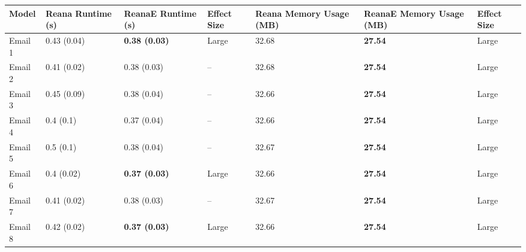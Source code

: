 \begin{tabular}{lllllll}
\toprule
   Model & Reana Runtime (s) &    ReanaE Runtime (s) & Effect Size & Reana Memory Usage (MB) & ReanaE Memory Usage (MB) & Effect Size \\
\midrule
 Email 1 &       0.43 (0.04) &  \textbf{0.38 (0.03)} &       Large &                   32.68 &           \textbf{27.54} &       Large \\
 Email 2 &       0.41 (0.02) &           0.38 (0.03) &          -- &                   32.68 &           \textbf{27.54} &       Large \\
 Email 3 &       0.45 (0.09) &           0.38 (0.04) &          -- &                   32.66 &           \textbf{27.54} &       Large \\
 Email 4 &         0.4 (0.1) &           0.37 (0.04) &          -- &                   32.66 &           \textbf{27.54} &       Large \\
 Email 5 &         0.5 (0.1) &           0.38 (0.04) &          -- &                   32.67 &           \textbf{27.54} &       Large \\
 Email 6 &        0.4 (0.02) &  \textbf{0.37 (0.03)} &       Large &                   32.66 &           \textbf{27.54} &       Large \\
 Email 7 &       0.41 (0.02) &           0.38 (0.03) &          -- &                   32.67 &           \textbf{27.54} &       Large \\
 Email 8 &       0.42 (0.02) &  \textbf{0.37 (0.03)} &       Large &                   32.66 &           \textbf{27.54} &       Large \\
\bottomrule
\end{tabular}

